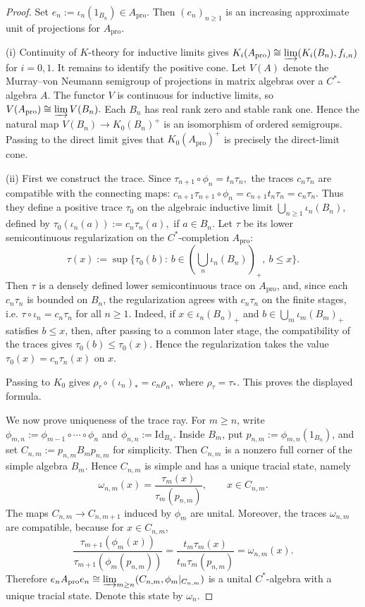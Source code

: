 \documentclass[10pt,a4paper]{amsart}
\newcommand{\ex}{\mathrm{pro}}
\newcommand{\id}{\mathrm{Id}}
\begin{document}
\begin{proof}
Set $e_n:=\iota_n(1_{B_n})\in A_{\ex}.$ Then $(e_n)_{n\geq1}$ is an increasing approximate unit of projections
for $A_{\ex}$.
\smallskip

\noindent
\textup{(i)}
Continuity of $K$-theory for inductive limits gives $K_i(A_{\ex})\cong \varinjlim(K_i(B_n),f_{i,n})$ for 
$i=0,1.$ It remains to identify the positive cone. Let $V(A)$ denote the
Murray--von Neumann semigroup of projections in matrix algebras over a
$C^*$-algebra $A$. The functor $V$ is continuous for inductive limits, so $V(A_{\ex})\cong\varinjlim V(B_n).$
Each $B_n$ has real rank zero and stable rank one. Hence the natural map $V(B_n)\longrightarrow K_0(B_n)^+$
is an isomorphism of ordered semigroups. Passing to the direct limit gives that
$K_0(A_{\ex})^+$ is precisely the direct-limit cone.

\smallskip

\noindent
\textup{(ii)}
First we construct the trace. Since $\tau_{n+1}\circ\phi_n=t_n\tau_n,$ the traces $c_n\tau_n$
are compatible with the connecting maps: $c_{n+1}\tau_{n+1}\circ\phi_n
=c_{n+1}t_n\tau_n
=c_n\tau_n.$
Thus they define a positive trace $\tau_0$ on the algebraic inductive limit $\bigcup_{n\geq1}\iota_n(B_n),$ defined by
$\tau_0(\iota_n(a)):=c_n\tau_n(a),$ if
$a\in B_n.$
Let $\tau$ be its lower semicontinuous regularization on the $C^*$-completion
$A_{\ex}$:
\[
\tau(x):=\sup\{\tau_0(b):\, b\in (\bigcup_n \iota_n(B_n))_+, \ b\le x\}.
\]
Then $\tau$ is a densely defined lower semicontinuous trace on $A_{\ex}$,
and, since each $c_n\tau_n$ is bounded on $B_n$, the regularization agrees
with $c_n\tau_n$ on the finite stages, i.e.  $\tau\circ\iota_n=c_n\tau_n$ for all
$n\geq1$.
Indeed, if $x\in \iota_n(B_n)_+$ and $b\in\bigcup_m\iota_m(B_m)_+$ satisfies
$b\leq x$, then, after passing to a common later stage, the compatibility of
the traces gives $\tau_0(b)\leq \tau_0(x)$. Hence the regularization takes the
value $\tau_0(x)=c_n\tau_n(x)$ on $x$.

Passing to $K_0$ gives $\rho_\tau\circ(\iota_n)_*=c_n\rho_n,$
where $\rho_\tau=\tau_*$. This proves the displayed formula.

We now prove uniqueness of the trace ray. For $m\geq n$, write $\phi_{m,n}:=\phi_{m-1}\circ\cdots\circ\phi_n$ and
$\phi_{n,n}:=\id_{B_n}.$ Inside \(B_m\), put $p_{n,m}:=\phi_{m,n}(1_{B_n})$, and set $C_{n,m}:=p_{n,m}B_m p_{n,m}$ for simplicity.
Then $C_{n,m}$ is a nonzero full corner of the simple algebra $B_m$. Hence
$C_{n,m}$ is simple and has a unique tracial state, namely
\[
\omega_{n,m}(x)
=
\frac{\tau_m(x)}{\tau_m(p_{n,m})},
\qquad x\in C_{n,m}.
\]
The maps $C_{n,m}\longrightarrow C_{n,m+1}$
induced by $\phi_m$ are unital. Moreover, the traces $\omega_{n,m}$ are
compatible, because for $x\in C_{n,m}$,
\[
\frac{\tau_{m+1}(\phi_m(x))}
     {\tau_{m+1}(\phi_m(p_{n,m}))}
=
\frac{t_m\tau_m(x)}
     {t_m\tau_m(p_{n,m})}
=
\omega_{n,m}(x).
\]
Therefore $e_nA_{\ex}e_n
\cong
\varinjlim_{m\geq n}(C_{n,m},\phi_m|_{C_{n,m}})$
is a unital $C^*$-algebra with a unique tracial state. Denote this state by $\omega_n.$


\end{proof}
\end{document}
